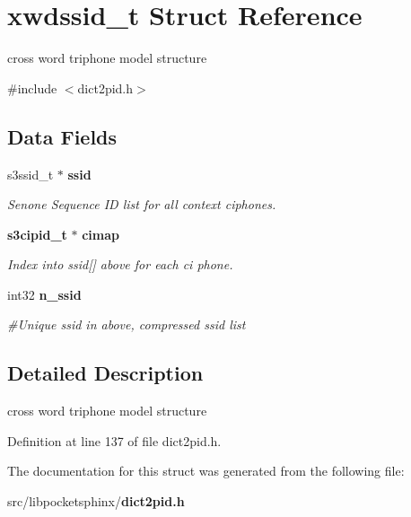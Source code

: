 \section{xwdssid\-\_\-t Struct Reference}
\label{structxwdssid__t}


cross word triphone model structure  




{\ttfamily \#include $<$dict2pid.\-h$>$}

\subsection*{Data Fields}
\begin{DoxyCompactItemize}
\item 
s3ssid\-\_\-t $\ast$ {\bf ssid}\label{structxwdssid__t_adbeeda6e94a51f08626c13414cdad6a8}

\begin{DoxyCompactList}\small\item\em Senone Sequence I\-D list for all context ciphones. \end{DoxyCompactList}\item 
{\bf s3cipid\-\_\-t} $\ast$ {\bf cimap}\label{structxwdssid__t_a502f9241a70383aa260d3390e4ff58fb}

\begin{DoxyCompactList}\small\item\em Index into ssid[] above for each ci phone. \end{DoxyCompactList}\item 
int32 {\bf n\-\_\-ssid}\label{structxwdssid__t_ab4443c642c5aff57c35abed070112d6e}

\begin{DoxyCompactList}\small\item\em \#\-Unique ssid in above, compressed ssid list \end{DoxyCompactList}\end{DoxyCompactItemize}


\subsection{Detailed Description}
cross word triphone model structure 

Definition at line 137 of file dict2pid.\-h.



The documentation for this struct was generated from the following file\-:\begin{DoxyCompactItemize}
\item 
src/libpocketsphinx/{\bf dict2pid.\-h}\end{DoxyCompactItemize}
